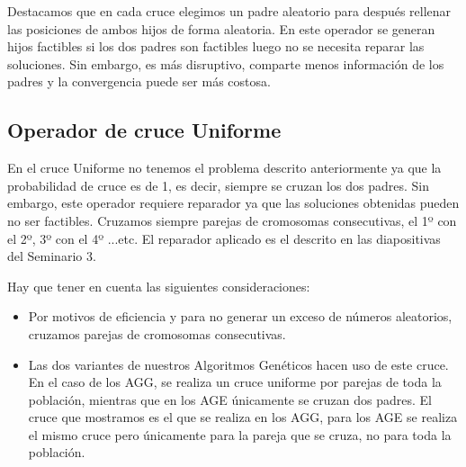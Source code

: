 Destacamos que en cada cruce elegimos un padre aleatorio para después rellenar las posiciones de ambos hijos de forma aleatoria.
En este operador se generan hijos factibles si los dos padres son factibles luego no se necesita reparar las soluciones. Sin embargo, es más disruptivo, comparte menos información de los padres y la convergencia puede ser más costosa.

\newpage 

\subsection{Operador de cruce Uniforme}
En el cruce Uniforme no tenemos el problema descrito anteriormente ya que la probabilidad de cruce es de 1, es decir, siempre se cruzan los dos padres. Sin embargo, este operador requiere reparador ya que las soluciones obtenidas pueden no ser factibles. Cruzamos siempre parejas de cromosomas consecutivas, el 1º con el 2º, 3º con el 4º ...etc. El reparador aplicado es el descrito en las diapositivas del Seminario 3.


Hay que tener en cuenta las siguientes consideraciones:
\begin{itemize}
	\item Por motivos de eficiencia y para no generar un exceso de números aleatorios, cruzamos parejas de cromosomas consecutivas.
	
	\item Las dos variantes de nuestros Algoritmos Genéticos hacen uso de este cruce. En el caso de los AGG, se realiza un cruce uniforme por parejas de toda la población, mientras que en los AGE únicamente se cruzan dos padres. El cruce que mostramos es el que se realiza en los AGG, para los AGE se realiza el mismo cruce pero únicamente para la pareja que se cruza, no para toda la población.
\end{itemize}

